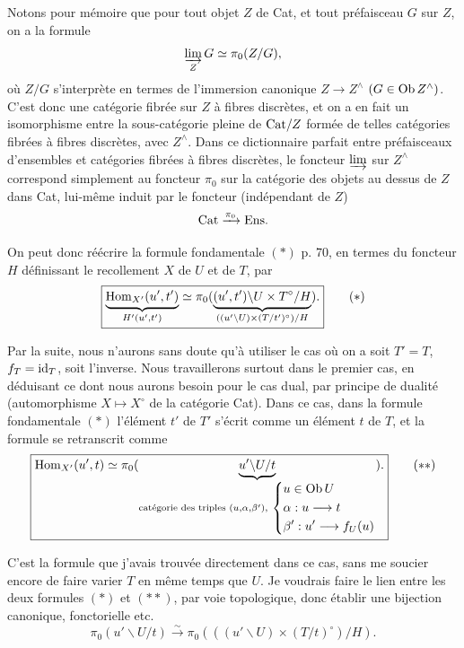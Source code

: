 Notons pour mémoire que pour tout objet $Z$ de Cat, et tout préfaisceau $G$ sur $Z$, on a la formule
\[
\varinjlim_{Z} G \simeq \pi_0(Z/G),
\]
où $Z/G$ s'interprète en termes de l'immersion canonique $Z\longrightarrow Z^{\wedge}$ $(G\in \mathrm{Ob}\, Z^{\wedge})$. C'est donc une catégorie fibrée sur $Z$ à fibres discrètes, et on a en fait un isomorphisme entre la sous-catégorie pleine de $\mathrm{Cat}/Z$ formée de telles catégories fibrées à fibres discrètes, avec $Z^{\wedge}$. Dans ce dictionnaire parfait entre préfaisceaux d'ensembles et catégories fibrées à fibres discrètes, le foncteur $\varinjlim$ sur $Z^{\wedge}$ correspond simplement au foncteur $\pi_0$ sur la catégorie des objets au dessus de $Z$ dans Cat, lui-même induit par le foncteur (indépendant de $Z$)
\[
\mathrm{Cat} \xrightarrow{\pi_0} \mathrm{Ens}.
\]

 On peut donc réécrire la formule fondamentale $(*)$ p. 70, en termes du foncteur $H$ définissant le recollement $X$ de $U$ et de $T$, par
\[
\boxed{\underbrace{\mathrm{Hom}_{X'}(u',t')}_{H'(u',t')} \simeq \pi_0(\underbrace{(u',t')\backslash U\times T^{\circ}/H}_{((u'\backslash U)\times(T/t')^{\circ})/H}).}
\tag*{$(*)$}
\]

Par la suite, nous n'aurons sans doute qu'à utiliser le cas où on a soit $T'=T$, $f_T=\mathrm{id}_T$, soit l'inverse. Nous travaillerons surtout dans le premier cas, en déduisant ce dont nous aurons besoin pour le cas dual, par principe de dualité (automorphisme $X\longmapsto X^{\circ}$ de la
catégorie Cat). Dans ce cas, dans la formule fondamentale $(*)$ l'élément $t'$ de $T'$ s'écrit comme un élément $t$ de $T$, et la formule se retranscrit comme
\[
\boxed{\mathrm{Hom}_{X'}(u',t) \simeq \pi_0(\underbrace{u'\backslash U/t}_{\text{catégorie des triples } (u,\alpha,\beta'),\ \left\{\begin{aligned} &u\in \mathrm{Ob}\, U\\ &\alpha : u\longrightarrow t\\ &\beta' : u'\longrightarrow f_U(u)\end{aligned}\right.}).}
\tag*{$(**)$}
\]

C'est la formule que j'avais trouvée directement dans ce cas, sans me soucier encore de faire varier $T$ en même temps que $U$. Je voudrais faire le lien entre les deux formules $(*)$ et $(**)$, par voie topologique, donc établir une bijection canonique, fonctorielle etc.
\[
\pi_0(u'\backslash U/t) \xrightarrow{\sim} \pi_0(((u'\backslash U)\times(T/t)^{\circ})/H).
\]

